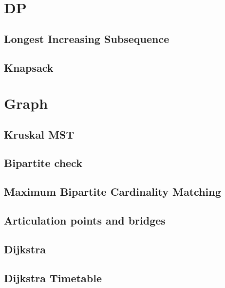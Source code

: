 \documentclass[a4paper,landscape,8pt]{article}
\begin{document}
\begin{multicols}{2}



\section{DP}

\subsection{Longest Increasing Subsequence}


\subsection{Knapsack}



\section{Graph}

\subsection{Kruskal MST}


\subsection{Bipartite check}


\subsection{Maximum Bipartite Cardinality Matching}


\subsection{Articulation points and bridges}


\subsection{Dijkstra}


\subsection{Dijkstra Timetable}



\end{multicols}
\end{document}
